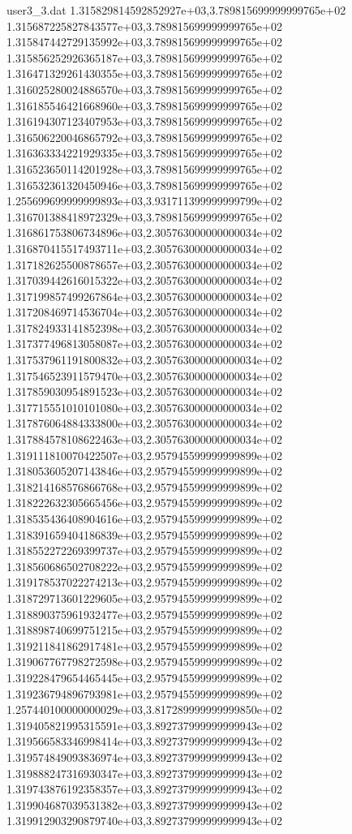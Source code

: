 \begin{filecontents}{user3_3.dat}
1.315829814592852927e+03,3.789815699999999765e+02
1.315687225827843577e+03,3.789815699999999765e+02
1.315847442729135992e+03,3.789815699999999765e+02
1.315856252926365187e+03,3.789815699999999765e+02
1.316471329261430355e+03,3.789815699999999765e+02
1.316025280024886570e+03,3.789815699999999765e+02
1.316185546421668960e+03,3.789815699999999765e+02
1.316194307123407953e+03,3.789815699999999765e+02
1.316506220046865792e+03,3.789815699999999765e+02
1.316363334221929335e+03,3.789815699999999765e+02
1.316523650114201928e+03,3.789815699999999765e+02
1.316532361320450946e+03,3.789815699999999765e+02
1.255699699999999893e+03,3.931711399999999799e+02
1.316701388418972329e+03,3.789815699999999765e+02
1.316861753806734896e+03,2.305763000000000034e+02
1.316870415517493711e+03,2.305763000000000034e+02
1.317182625500878657e+03,2.305763000000000034e+02
1.317039442616015322e+03,2.305763000000000034e+02
1.317199857499267864e+03,2.305763000000000034e+02
1.317208469714536704e+03,2.305763000000000034e+02
1.317824933141852398e+03,2.305763000000000034e+02
1.317377496813058087e+03,2.305763000000000034e+02
1.317537961191800832e+03,2.305763000000000034e+02
1.317546523911579470e+03,2.305763000000000034e+02
1.317859030954891523e+03,2.305763000000000034e+02
1.317715551010101080e+03,2.305763000000000034e+02
1.317876064884333800e+03,2.305763000000000034e+02
1.317884578108622463e+03,2.305763000000000034e+02
1.319111810070422507e+03,2.957945599999999899e+02
1.318053605207143846e+03,2.957945599999999899e+02
1.318214168576866768e+03,2.957945599999999899e+02
1.318222632305665456e+03,2.957945599999999899e+02
1.318535436408904616e+03,2.957945599999999899e+02
1.318391659404186839e+03,2.957945599999999899e+02
1.318552272269399737e+03,2.957945599999999899e+02
1.318560686502708222e+03,2.957945599999999899e+02
1.319178537022274213e+03,2.957945599999999899e+02
1.318729713601229605e+03,2.957945599999999899e+02
1.318890375961932477e+03,2.957945599999999899e+02
1.318898740699751215e+03,2.957945599999999899e+02
1.319211841862917481e+03,2.957945599999999899e+02
1.319067767798272598e+03,2.957945599999999899e+02
1.319228479654465445e+03,2.957945599999999899e+02
1.319236794896793981e+03,2.957945599999999899e+02
1.257440100000000029e+03,3.817289999999999850e+02
1.319405821995315591e+03,3.892737999999999943e+02
1.319566583346998414e+03,3.892737999999999943e+02
1.319574849093836974e+03,3.892737999999999943e+02
1.319888247316930347e+03,3.892737999999999943e+02
1.319743876192358357e+03,3.892737999999999943e+02
1.319904687039531382e+03,3.892737999999999943e+02
1.319912903290879740e+03,3.892737999999999943e+02

\end{filecontents}

